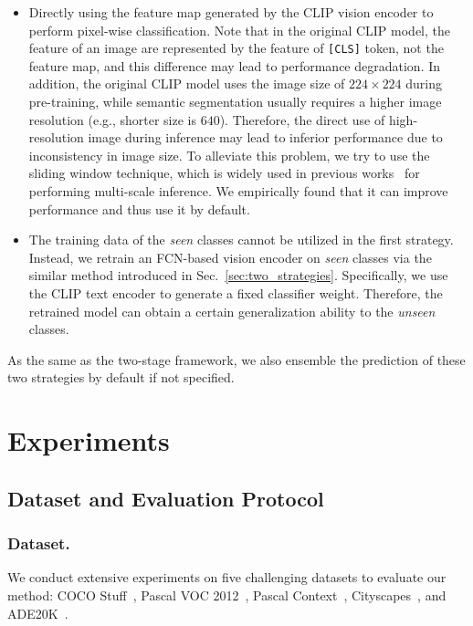 \documentclass[runningheads]{llncs}
\begin{document}
\begin{itemize}
    \item Directly using the feature map generated by the CLIP vision encoder to perform pixel-wise classification. Note that in the original CLIP model, the feature of an image are represented by the feature of \texttt{[CLS]} token, not the feature map, and this difference may lead to performance degradation. In addition, the original CLIP model uses the image size of $224\times 224$ during pre-training, while semantic segmentation usually requires a higher image resolution (e.g., shorter size is $640$). Therefore, the direct use of high-resolution image during inference may lead to inferior performance due to inconsistency in image size. To alleviate this problem, we try to use the sliding window technique, which is widely used in previous works~\cite{chen2017deeplab} for performing multi-scale inference. We empirically found that it can improve performance and thus use it by default.
    
    \item The training data of the \emph{seen} classes cannot be utilized in the first strategy. Instead, we retrain an FCN-based vision encoder on \emph{seen} classes via the similar method introduced in Sec.~\ref{sec:two_strategies}. Specifically, we use the CLIP text encoder to generate a fixed classifier weight. Therefore, the retrained model can obtain a certain generalization ability to the \emph{unseen} classes.
\end{itemize}

As the same as the two-stage framework, we also ensemble the prediction of these two strategies by default if not specified.

\section{Experiments}
\subsection{Dataset and Evaluation Protocol}
\subsubsection{Dataset.}
We conduct extensive experiments on five challenging datasets to evaluate our method: COCO Stuff~\cite{caesar2018coco}, Pascal VOC 2012~\cite{everingham2011pascal}, Pascal Context~\cite{mottaghi2014role}, Cityscapes~\cite{cordts2016cityscapes}, and ADE20K~\cite{zhou2017scene}. 
\end{document}
